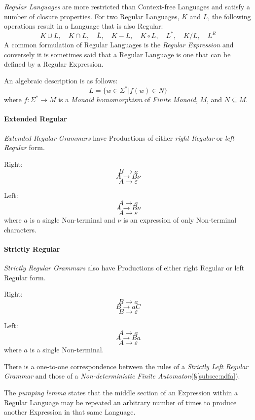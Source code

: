 \documentclass{article}
\begin{document}
\emph{Regular Languages} are more restricted than Context-free
Languages and satisfy a number of closure properties. For two Regular
Languages, $K$ and $L$, the following operations result in a Language
that is also Regular:
\[
    K \cup L, \quad
    K \cap L, \quad
    \overline{L}, \quad
    K - L, \quad
    K \circ L, \quad
    L^*, \quad
    K / L, \quad
    L^R
\]
A common formulation of Regular Languages is the \emph{Regular
  Expression} and conversely it is sometimes said that a Regular
Language is one that can be defined by a Regular Expression.

An algebraic description is as follows:
\[
    L = \{ w \in \Sigma^* | f(w) \in N \}
\]
where $f : \Sigma^* \rightarrow M$ is a \emph{Monoid homomorphism} of
\emph{Finite Monoid}, $M$, and $N \subseteq M$.

\paragraph{Extended Regular}
\emph{Extended Regular Grammars} have Productions of either \emph{right
Regular} or \emph{left Regular} form.

Right:
\[
    B \rightarrow a
\]\[
    A \rightarrow B \nu
\]\[
    A \rightarrow \varepsilon
\]

Left:
\[
    A \rightarrow a
\]\[
    A \rightarrow B \nu
\]\[
    A \rightarrow \varepsilon
\]
where $a$ is a single Non-terminal and $\nu$ is an expression of only
Non-terminal characters.

\paragraph{Strictly Regular}
\emph{Strictly Regular Grammars} also have Productions of either right
Regular or left Regular form.

Right:
\[
    B \rightarrow a
\]\[
    B \rightarrow aC
\]\[
    B \rightarrow \varepsilon
\]

Left:
\[
    A \rightarrow a
\]\[
    A \rightarrow Ba
\]\[
    A \rightarrow \varepsilon
\]
where $a$ is a single Non-terminal.

There is a one-to-one correspondence between the rules of a
\emph{Strictly Left Regular Grammar} and those of a
\emph{Non-deterministic Finite Automaton}(\S\ref{subsec:ndfa}).

The \emph{pumping lemma} states that the middle section of an
Expression within a Regular Language may be repeated an arbitrary
number of times to produce another Expression in that same Language.
\end{document}
